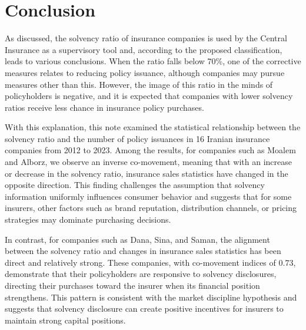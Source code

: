 \documentclass[twoside]{article}
\begin{document}

\section{Conclusion}

As discussed, the solvency ratio of insurance companies is used by the Central Insurance as a supervisory tool and, according to the proposed classification, leads to various conclusions. When the ratio falls below 70\%, one of the corrective measures relates to reducing policy issuance, although companies may pursue measures other than this. However, the image of this ratio in the minds of policyholders is negative, and it is expected that companies with lower solvency ratios receive less chance in insurance policy purchases.

With this explanation, this note examined the statistical relationship between the solvency ratio and the number of policy issuances in 16 Iranian insurance companies from 2012 to 2023. Among the results, for companies such as Moalem and Alborz, we observe an inverse co-movement, meaning that with an increase or decrease in the solvency ratio, insurance sales statistics have changed in the opposite direction. This finding challenges the assumption that solvency information uniformly influences consumer behavior and suggests that for some insurers, other factors such as brand reputation, distribution channels, or pricing strategies may dominate purchasing decisions.

In contrast, for companies such as Dana, Sina, and Saman, the alignment between the solvency ratio and changes in insurance sales statistics has been direct and relatively strong. These companies, with co-movement indices of 0.73, demonstrate that their policyholders are responsive to solvency disclosures, directing their purchases toward the insurer when its financial position strengthens. This pattern is consistent with the market discipline hypothesis and suggests that solvency disclosure can create positive incentives for insurers to maintain strong capital positions.
\end{document}
